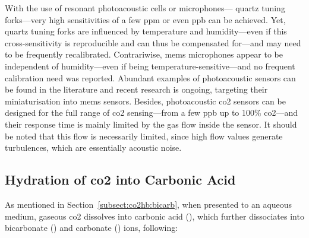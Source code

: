 With the use of resonant photoacoustic cells or microphones---\eg{} quartz tuning forks---very high sensitivities of a few ppm or even ppb can be achieved\cite{borri2014}. Yet, quartz tuning forks are influenced by temperature and humidity---even if this cross-sensitivity is reproducible and can thus be compensated for---and may need to be frequently recalibrated\cite{rousseau2019}. Contrariwise, \gls{mems} microphones appear to be independent of humidity---even if being temperature-sensitive---and no frequent calibration need was reported\cite{scholz2017}. Abundant examples of photoacoustic sensors can be found in the literature\cite{huber2015, pernau2016, scholz2017} and recent research is ongoing, targeting their miniaturisation into \gls{mems} sensors\cite{lhermet2019}. Besides, photoacoustic \gls{co2} sensors can be designed for the full range of \gls{co2} sensing---from a few ppb up to 100\% \gls{co2}---and their response time is mainly limited by the gas flow inside the sensor. It should be noted that this flow is necessarily limited, since high flow values generate turbulences, which are essentially acoustic noise\cite{bozoki2011}.

\subsection{Hydration of \texorpdfstring{\gls{co2}}{CO2} into Carbonic Acid}\label{subsect:choos:review:hydration}

As mentioned in Section~\ref{subsect:co2hb:bicarb}, when presented to an aqueous medium, gaseous \gls{co2} dissolves into carbonic acid (), which further dissociates into bicarbonate () and carbonate () ions, following\cite{jensen1979, mills2009}:

